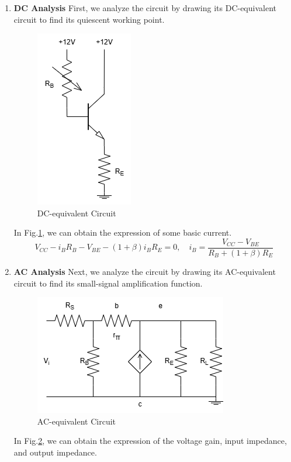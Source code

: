     \begin{enumerate}[I]
        \item \textbf{DC Analysis}
            First, we analyze the circuit by drawing its DC-equivalent circuit to find its quiescent working point.\par
            \begin{figure}[H]
                \centering
                \includegraphics[width=0.2\linewidth]{Experiment_07/Circuit/Lab7dc.drawio.png}
                \caption{DC-equivalent Circuit}
                \label{cir:7dc}
            \end{figure}
            In Fig.\ref{cir:7dc}, we can obtain the expression of some basic current.
            \begin{equation}
                V_{CC} - i_B R_B - V_{BE} - (1+\beta) i_B R_E = 0, \quad
                i_B = \frac{V_{CC} - V_{BE}}{R_B + (1+\beta) R_E}     
            \end{equation}
        \item \textbf{AC Analysis}
            Next, we analyze the circuit by drawing its AC-equivalent circuit to find its small-signal amplification function.\par
            \begin{figure}[H]
                \centering
                \includegraphics[width=0.5\linewidth]{Experiment_07/Circuit/Lab7ac.drawio.png}
                \caption{AC-equivalent Circuit}
                \label{cir:7ac}
            \end{figure}
            In Fig.\ref{cir:7ac}, we can obtain the expression of the voltage gain, input impedance, and output impedance.

\end{enumerate}

